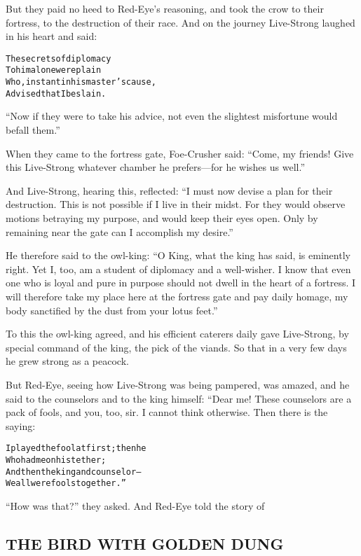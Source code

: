 \documentclass{article}
\renewenvironment{verbatim}{\begin{alltt}\normalfont\begin{centering}}{\end{centering}\end{alltt}}
\begin{document}
But they paid no heed to Red-Eye's reasoning, and took the crow to
their fortress, to the destruction of their race. And on the
journey Live-Strong laughed in his heart and said:

\begin{verbatim}
The secrets of diplomacy
    To him alone were plain
Who, instant in his master's cause,
    Advised that I be slain.
\end{verbatim}
``Now if they were to take his advice, not even the slightest misfortune would befall them.''

When they came to the fortress gate, Foe-Crusher said:
``Come, my friends! Give this Live-Strong whatever chamber he prefers---for he wishes us well.''

And Live-Strong, hearing this, reflected:
``I must now devise a plan for their destruction. This is not possible if I live in their midst. For they would observe motions betraying my purpose, and would keep their eyes open. Only by remaining near the gate can I accomplish my desire.''

He therefore said to the owl-king:
``O King, what the king has said, is eminently right. Yet I, too, am a student of diplomacy and a well-wisher. I know that even one who is loyal and pure in purpose should not dwell in the heart of a fortress. I will therefore take my place here at the fortress gate and pay daily homage, my body sanctified by the dust from your lotus feet.''

To this the owl-king agreed, and his efficient caterers daily gave
Live-Strong, by special command of the king, the pick of the
viands. So that in a very few days he grew strong as a peacock.

But Red-Eye, seeing how Live-Strong was being pampered, was amazed,
and he said to the counselors and to the king himself: “Dear me!
These counselors are a pack of fools, and you, too, sir. I cannot
think otherwise. Then there is the saying:

\begin{verbatim}
I played the fool at first; then he
    Who had me on his tether;
And then the king and counselor--
    We all were fools together.”
\end{verbatim}
``How was that?'' they asked. And Red-Eye told the story of

\subsection{THE BIRD WITH GOLDEN DUNG}
\end{document}
